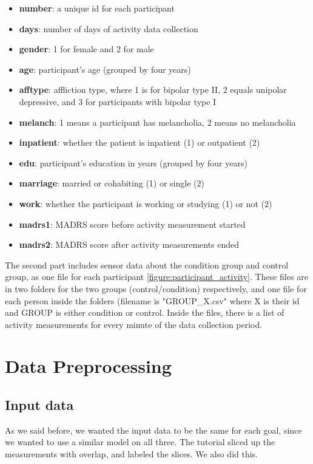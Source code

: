 \begin{itemize}
    \item \textbf{number}: a unique id for each participant
    \item \textbf{days}: number of days of activity data collection 
    \item \textbf{gender}: 1 for female and 2 for male
    \item \textbf{age}: participant's age (grouped by four years)
    \item \textbf{afftype}: affliction type, where 1 is for bipolar type II, 2 equals unipolar depressive, and 3 for participants with bipolar type I
    \item \textbf{melanch}: 1 means a participant has melancholia, 2 means no melancholia
    \item \textbf{inpatient}: whether the patient is inpatient (1) or outpatient (2)
    \item \textbf{edu}: participant's education in years (grouped by four years)
    \item \textbf{marriage}: married or cohabiting (1) or single (2)
    \item \textbf{work}: whether the participant is working or studying (1) or not (2)
    \item \textbf{madrs1}: MADRS score before activity measurement started
    \item \textbf{madrs2}: MADRS score after activity measurements ended
\end{itemize}

The second part includes sensor data about the condition group and control group, as one file for each participant \ref{figure:participant_activity}. These files are in two folders for the two groups (control/condition) respectively, and one file for each person inside the folders (filename is "GROUP\_X.csv" where X is their id and GROUP is either condition or control. Inside the files, there is a list of activity measurements for every minute of the data collection period.

\section{Data Preprocessing}

\subsection{Input data}

As we said before, we wanted the input data to be the same for each goal, since we wanted to use a similar model on all three.
The tutorial \cite{1d_cnn} sliced up the measurements with overlap, and labeled the slices. We also did this.

